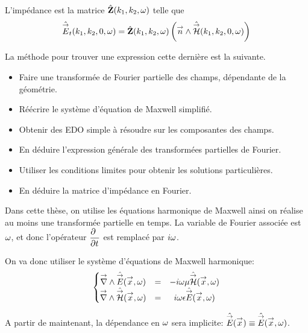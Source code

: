 \begin{defn}
    L'impédance est la matrice \(\hat\mZ(k_1,k_2,\w)\) telle que
    \begin{equation*}
        \hat{\vE}_t(k_1,k_2,0,\w) =  \hat{\mZ}(k_1,k_2,\w) \left(\vn \pvect \hat{\vH}(k_1,k_2,0,\w) \right)
    \end{equation*}
\end{defn}

La méthode pour trouver une expression cette dernière est la suivante.
\begin{itemize}
    \item Faire une transformée de Fourier partielle des champs, dépendante de la géométrie.
    \item Réécrire le système d'équation de Maxwell simplifié.
    \item Obtenir des EDO simple à résoudre sur les composantes des champs.
    \item En déduire l'expression générale des transformées partielles de Fourier.
    \item Utiliser les conditions limites pour obtenir les solutions particulières.
    \item En déduire la matrice d'impédance en Fourier.
\end{itemize}

Dans cette thèse, on utilise les équations harmonique de Maxwell ainsi on réalise au moins une transformée partielle en temps. La variable de Fourier associée est \(\w\), et donc l'opérateur \(\ddr{t}{~}\) est remplacé par \(i\w\).

On va donc utiliser le système d'équations de Maxwell harmonique:
\begin{equation}
    \left\lbrace
    \begin{matrix}
    \vrot \hat \vE(\vx,\w)  &=& -i \omega \mu \hat \vH(\vx,\w)  \\
    \vrot \hat \vH(\vx,\w)  &=& i \omega \eps \hat \vE(\vx,\w)
    \end{matrix}
    \right.
    \label{eq:imp_fourier:intro:maxwell_harmonique}
\end{equation}

A partir de maintenant, la dépendance en \(\w\) sera implicite: \(\hat \vE(\vx) \equiv \hat \vE (\vx, \w)\).